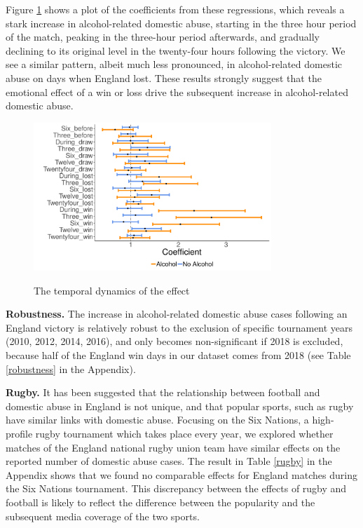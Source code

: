 \documentclass[12pt, letterpaper]{article}
\begin{document}
Figure \ref{fig:threehours} shows a plot of the coefficients from these regressions, which reveals a stark increase in alcohol-related domestic abuse, starting in the three hour period of the match, peaking in the three-hour period afterwards, and gradually declining to its original level in the twenty-four hours following the victory. We see a similar pattern, albeit much less pronounced, in alcohol-related domestic abuse on days when England lost. These results strongly suggest that the emotional effect of a win or loss drive the subsequent increase in alcohol-related domestic abuse.


\begin{figure}
\centering
 \caption{The temporal dynamics of the effect}
\includegraphics[width=0.8\textwidth]{Threehours.pdf}
\label{fig:threehours}
\end{figure}

\textbf{Robustness.} The increase in alcohol-related domestic abuse cases following an England victory is relatively robust to the exclusion of specific tournament years (2010, 2012, 2014, 2016), and only becomes non-significant if 2018 is excluded, because half of the England win days in our dataset comes from 2018 (see Table \ref{robustness} in the Appendix). 

\textbf{Rugby.} It has been suggested that the relationship between football and domestic abuse in England is not unique, and that popular sports, such as rugby have similar links with domestic abuse\autocite{Brooks-Hay2018}. Focusing on the Six Nations, a high-profile rugby tournament which takes place every year, we explored whether matches of the England national rugby union team have similar effects on the reported number of domestic abuse cases. The result in Table \ref{rugby} in the Appendix shows that we found no comparable effects for England matches during the Six Nations tournament. This discrepancy between the effects of rugby and football is likely to reflect the difference between the popularity and the subsequent media coverage of the two sports.
\end{document}
